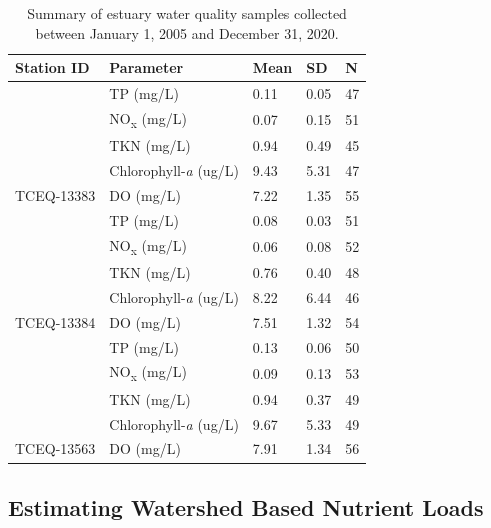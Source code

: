 \documentclass[fleqn,10pt,lineno]{wlpeerj} %
\begin{document}
\begin{table}

\caption{\label{tab:table2}Summary of estuary water quality samples collected between January 1, 2005 and December 31, 2020.}
\centering
\begin{tabular}[t]{lllll}
\toprule
Station ID & Parameter & Mean & SD & N\\
\midrule
 & TP (mg/L) & 0.11 & 0.05 & 47\\

 & NO\textsubscript{x} (mg/L) & 0.07 & 0.15 & 51\\

 & TKN (mg/L) & 0.94 & 0.49 & 45\\

 & Chlorophyll-\textit{a} (ug/L) & 9.43 & 5.31 & 47\\

\multirow{-5}{*}{\raggedright\arraybackslash TCEQ-13383} & DO (mg/L) & 7.22 & 1.35 & 55\\
\cmidrule{1-5}
 & TP (mg/L) & 0.08 & 0.03 & 51\\

 & NO\textsubscript{x} (mg/L) & 0.06 & 0.08 & 52\\

 & TKN (mg/L) & 0.76 & 0.40 & 48\\

 & Chlorophyll-\textit{a} (ug/L) & 8.22 & 6.44 & 46\\

\multirow{-5}{*}{\raggedright\arraybackslash TCEQ-13384} & DO (mg/L) & 7.51 & 1.32 & 54\\
\cmidrule{1-5}
 & TP (mg/L) & 0.13 & 0.06 & 50\\

 & NO\textsubscript{x} (mg/L) & 0.09 & 0.13 & 53\\

 & TKN (mg/L) & 0.94 & 0.37 & 49\\

 & Chlorophyll-\textit{a} (ug/L) & 9.67 & 5.33 & 49\\

\multirow{-5}{*}{\raggedright\arraybackslash TCEQ-13563} & DO (mg/L) & 7.91 & 1.34 & 56\\
\bottomrule
\end{tabular}
\end{table}

\hypertarget{estimating-watershed-based-nutrient-loads}{%
\subsection*{Estimating Watershed Based Nutrient
Loads}\label{estimating-watershed-based-nutrient-loads}}
\end{document}
